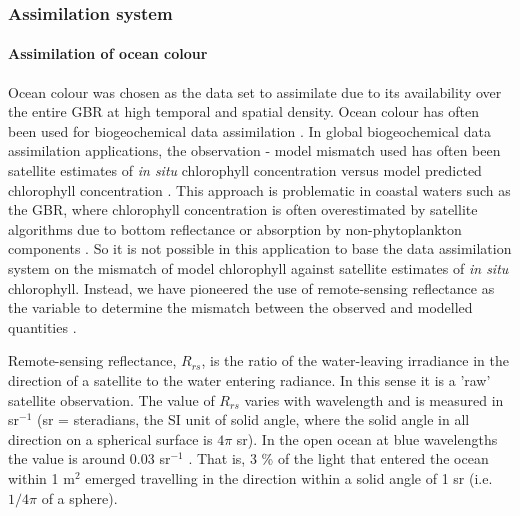 \subsubsection{Assimilation system}

\paragraph{Assimilation of ocean colour}

Ocean colour was chosen as the data set to assimilate due to its availability over the entire GBR at
high temporal and spatial density. Ocean colour has often been used for biogeochemical data
assimilation \citep{Kidston13}. In global biogeochemical data assimilation applications, the
observation - model mismatch used has often been satellite estimates of \textit{in situ} chlorophyll
concentration versus model predicted chlorophyll concentration \citep{Ford12}. This approach is
problematic in coastal waters such as the GBR, where chlorophyll concentration is often
overestimated by satellite algorithms due to bottom reflectance or absorption by non-phytoplankton
components \citep{Schroeder12b}. So it is not possible in this application to base the data
assimilation system on the mismatch of model chlorophyll against satellite estimates of \textit{in
situ} chlorophyll. Instead, we have pioneered the use of remote-sensing reflectance as the variable
to determine the mismatch between the observed and modelled quantities \citep{Jones16}.

Remote-sensing reflectance, $R_{rs}$, is the ratio of the water-leaving irradiance in the direction
of a satellite to the water entering radiance. In this sense it is a 'raw' satellite
observation. The value of $R_{rs}$ varies with wavelength and is measured in sr$^{-1}$ (sr =
steradians, the SI unit of solid angle, where the solid angle in all direction on a spherical
surface is $4 \pi$ sr). In the open ocean at blue wavelengths the value is around 0.03 sr$^{-1}$
\citep{Baird16a}. That is, 3 \% of the light that entered the ocean within 1 m$^{2}$ emerged
travelling in the direction within a solid angle of 1 sr (i.e. $1 / 4 \pi$ of a sphere).

